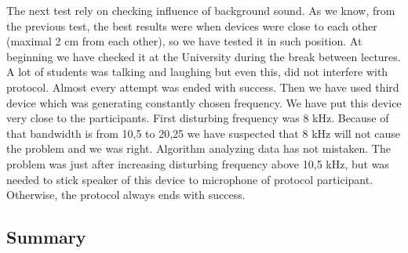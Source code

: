\documentclass[11pt,titlepage]{article}
\theoremstyle{plain}
\begin{document}
\vspace{5mm}

The next test rely on checking influence of background sound. As we know, from the previous test, the best results were when devices were close to each other (maximal 2 cm from each other), so we have tested it in such position. At beginning we have checked it at the University during the break between lectures. A lot of students was talking and laughing but even this, did not interfere with protocol. Almost every attempt was ended with success. Then we have used third device which was generating constantly chosen frequency. We have put this device very close to the participants. First disturbing frequency was 8 kHz. Because of that bandwidth is from 10,5 to 20,25 we have suspected that 8 kHz will not cause the problem and we was right. Algorithm analyzing data has not mistaken. The problem was just after increasing disturbing frequency above 10,5 kHz, but was needed to stick speaker of this device to microphone of protocol participant. Otherwise, the protocol always ends with success. 


\subsection{Summary}





\end{document}
